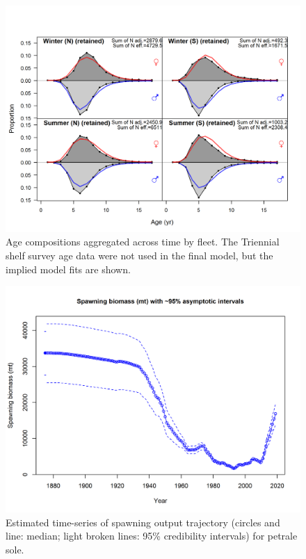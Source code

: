 \documentclass[12pt,]{article}
\begin{document}
\FloatBarrier

\begin{figure}
\centering
\includegraphics{r4ss/plots_mod1/comp_agefit__aggregated_across_time.png}
\caption{Age compositions aggregated across time by fleet. The Triennial
shelf survey age data were not used in the final model, but the implied
model fits are shown. \label{fig:age_agg}}
\end{figure}

\FloatBarrier

\begin{figure}
\centering
\includegraphics{r4ss/plots_mod1/ts7_Spawning_biomass_(mt)_with_95_asymptotic_intervals_intervals}
\caption{Estimated time-series of spawning output trajectory (circles
and line: median; light broken lines: 95\% credibility intervals) for
petrale sole. \label{fig:ssb}}
\end{figure}
\end{document}
